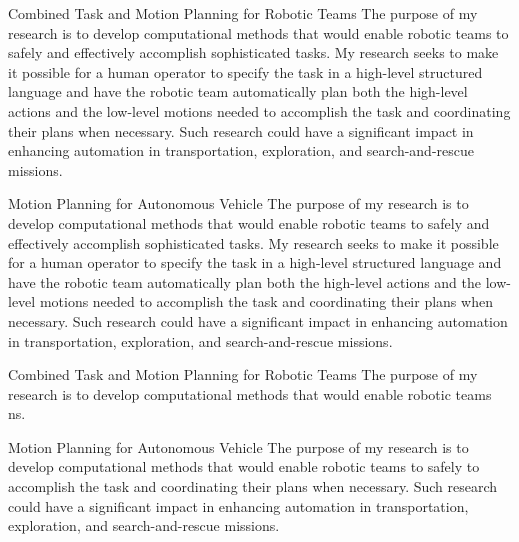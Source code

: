 \begin{researchentries}
  \researchentry
    {Combined Task and Motion Planning for Robotic Teams}
    {The purpose of my research is to develop computational methods that would enable robotic teams
to safely and effectively accomplish sophisticated tasks. My research seeks to make it possible for
a human operator to specify the task in a high-level structured language and have the robotic team
automatically plan both the high-level actions and the low-level motions needed to accomplish the
task and coordinating their plans when necessary. Such research could have a significant impact in
enhancing automation in transportation, exploration, and search-and-rescue missions.}

  \researchentry
    {Motion Planning for Autonomous Vehicle}
    {The purpose of my research is to develop computational methods that would enable robotic teams
to safely and effectively accomplish sophisticated tasks. My research seeks to make it possible for
a human operator to specify the task in a high-level structured language and have the robotic team
automatically plan both the high-level actions and the low-level motions needed to accomplish the
task and coordinating their plans when necessary. Such research could have a significant impact in
enhancing automation in transportation, exploration, and search-and-rescue missions.}
\end{researchentries}

\begin{researchentries}
  \researchentry
    {Combined Task and Motion Planning for Robotic Teams}
    {The purpose of my research is to develop computational methods that would enable robotic teams
ns.}

  \researchentry
    {Motion Planning for Autonomous Vehicle}
    {The purpose of my research is to develop computational methods that would enable robotic teams
to safely to accomplish the
task and coordinating their plans when necessary. Such research could have a significant impact in
enhancing automation in transportation, exploration, and search-and-rescue missions.}
\end{researchentries}